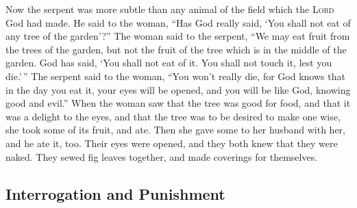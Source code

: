  Now the serpent was more subtle than any animal of the
field which the \textsc{Lord} God had made. He said to the woman, ``Has
God really said, `You shall not eat of any tree of the garden'?''
 The woman said to the serpent, ``We may eat fruit from
the trees of the garden,  but not the fruit of the tree
which is in the middle of the garden. God has said, `You shall not eat
of it. You shall not touch it, lest you die.'\,''  The
serpent said to the woman, ``You won't really die,  for
God knows that in the day you eat it, your eyes will be opened, and you
will be like God, knowing good and evil.''  When the woman
saw that the tree was good for food, and that it was a delight to the
eyes, and that the tree was to be desired to make one wise, she took
some of its fruit, and ate. Then she gave some to her husband with her,
and he ate it, too.  Their eyes were opened, and they both
knew that they were naked. They sewed fig leaves together, and made
coverings for themselves.

\hypertarget{interrogation-and-punishment}{%
\subsection{Interrogation and
Punishment}\label{interrogation-and-punishment}}

